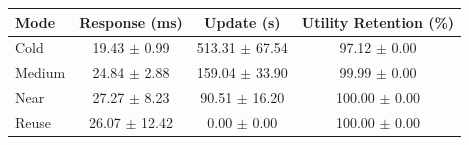 \begin{tabular}{lccc}
\hline
\textbf{Mode} & \textbf{Response (ms)} & \textbf{Update (s)} & \textbf{Utility Retention (\%)} \\
\hline
Cold & 19.43 $\pm$ 0.99 & 513.31 $\pm$ 67.54 & 97.12 $\pm$ 0.00 \\
Medium & 24.84 $\pm$ 2.88 & 159.04 $\pm$ 33.90 & 99.99 $\pm$ 0.00 \\
Near & 27.27 $\pm$ 8.23 & 90.51 $\pm$ 16.20 & 100.00 $\pm$ 0.00 \\
Reuse & 26.07 $\pm$ 12.42 & 0.00 $\pm$ 0.00 & 100.00 $\pm$ 0.00 \\
\hline
\end{tabular}
